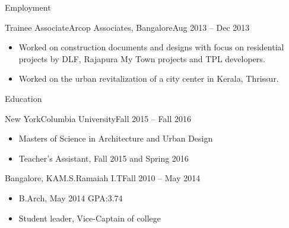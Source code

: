 \documentclass[]{nakulcv}
\begin{document}
\begin{cvsection}{Employment}
		\begin{cvsubsection}{Trainee Associate}{Arcop Associates, Bangalore}{Aug 2013 – Dec 2013}
			\begin{itemize}
				\item Worked on construction documents and designs with focus on residential projects by DLF, Rajapura My Town projects and TPL developers.
				\item Worked on the urban revitalization of a city center in Kerala, Thrissur.
			\end{itemize}	
		\end{cvsubsection}
		\end{cvsection}
	\begin{cvsection}{Education}
		\begin{cvsubsection}{New York}{Columbia University}{Fall 2015 -- Fall 2016}
			\begin{itemize}
				\item Masters of Science in Architecture and Urban Design 
				\item Teacher’s Assistant, Fall 2015 and Spring 2016
			\end{itemize}
		\end{cvsubsection}
		\begin{cvsubsection}{Bangalore, KA}{M.S.Ramaiah I.T}{Fall 2010 -- May 2014}
			\begin{itemize}
				\item B.Arch, May 2014 GPA:3.74
				\item Student leader, Vice-Captain of college
			\end{itemize}
		\end{cvsubsection}
	\end{cvsection}
\end{document}
